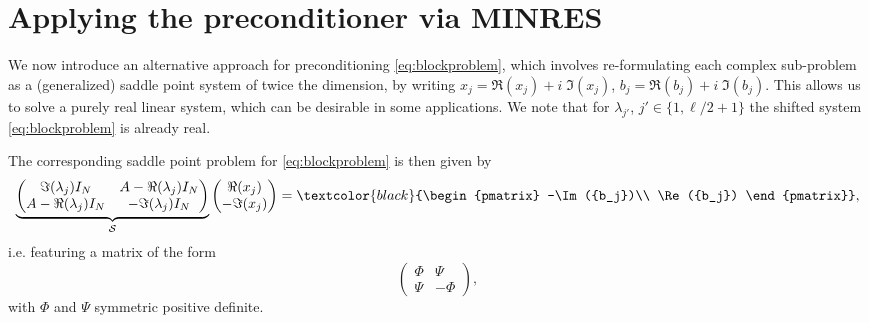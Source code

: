 \documentclass{article}
\newcommand{\jt}{\textcolor{black}}%
\newcommand{\sizeA}{N}
\newcommand{\phimat}{\Phi}
\newcommand{\psimat}{\Psi}
\theoremstyle{definition}
\begin{document}
{		
		
		
		
		\section{Applying the preconditioner via MINRES}\label{sec:SP}
		
		We now introduce an alternative approach for preconditioning \eqref{eq:blockproblem}, which involves re-formulating each complex sub-problem as a (generalized) saddle point system of twice the dimension, by writing 
		${x_j = \Re({x_j}) + i \;\Im({x_j})}$,
		${b_j = \Re({b_j}) + i \;\Im({b_j})}$. 
		This allows us to solve a purely real linear system, which can be desirable in some applications. We note that for $\lambda_{j'}$, $j' \in \{1,\ell/2+1\}$ the shifted system \eqref{eq:blockproblem} is already real.
		
		The corresponding saddle point problem for \eqref{eq:blockproblem} is then given by 
		\begin{equation}\label{eq:saddlesystem}
			\underbrace{\begin{pmatrix}
					\Im(\lambda_j)I_\sizeA & {A}-\Re(\lambda_j)I_\sizeA \\
					{A}-\Re(\lambda_j)I_\sizeA & -\Im(\lambda_j)I_\sizeA
			\end{pmatrix}}_{\mathcal{S}}\begin{pmatrix}
				\Re({x_j}) \\ -\Im({x_j})
			\end{pmatrix} =  \jt{\begin{pmatrix}
					-\Im({b_j})\\ \Re({b_j}) 
			\end{pmatrix}},
		\end{equation}
		i.e. featuring a matrix of the form 
		\begin{equation*}
			\begin{pmatrix}
				\phimat & \psimat\\ \psimat & -\phimat
			\end{pmatrix},
		\end{equation*}
		with $\phimat$ and $\psimat$ symmetric positive definite.
		
		
		
}
\end{document}
